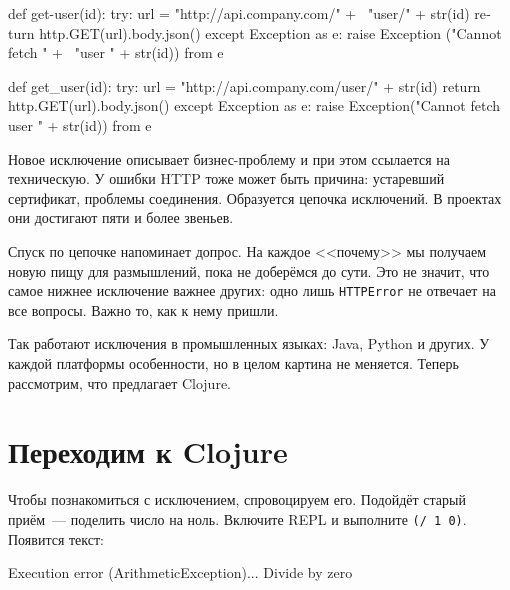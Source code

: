 \ifx\DEVICETYPE\MOBILE

\begin{english}
  \begin{python}
def get-user(id):
  try:
    url = "http://api.company.com/" + \
          "user/" + str(id)
    return http.GET(url).body.json()
  except Exception as e:
    raise Exception ("Cannot fetch " + \
          "user " + str(id)) from e
  \end{python}
\end{english}

\else

\begin{english}
  \begin{js}
def get_user(id):
  try:
    url = "http://api.company.com/user/" + str(id)
    return http.GET(url).body.json()
  except Exception as e:
    raise Exception("Cannot fetch user " + str(id)) from e

  \end{js}
\end{english}

\fi


Новое исключение описывает бизнес-проб\-ле\-му и при этом ссылается на
техническую. У ошибки HTTP тоже может быть причина: устаревший сертификат,
проблемы соединения. Образуется цепочка исключений. В проектах они достигают
пяти и более звеньев.

Спуск по цепочке напоминает допрос. На каждое <<почему>> мы получаем новую пищу
для размышлений, пока не доберёмся до сути. Это не значит, что самое нижнее
исключение важнее других: одно лишь \verb|HTTPError| не отвечает на все
вопросы. Важно то, как к нему пришли.

Так работают исключения в промышленных языках: Java, Python и других. У каждой
платформы особенности, но в целом картина не меняется. Теперь рассмотрим, что
предлагает Clojure.

\section{Переходим к Clojure}

Чтобы познакомиться с исключением, спровоцируем его. Подойдёт старый
приём~--- поделить число на ноль. Включите REPL и выполните
\verb|(/ 1 0)|. Появится текст:


\begin{english}
  \begin{text}
Execution error (ArithmeticException)...
Divide by zero
  \end{text}
\end{english}

